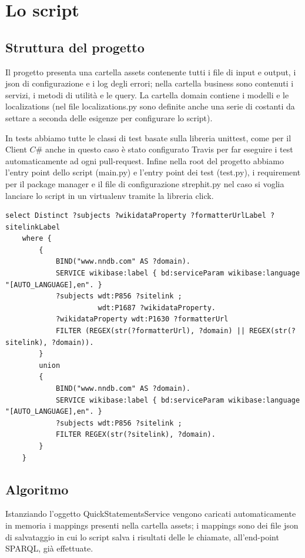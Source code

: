 \section{Lo script}

\subsection{Struttura del progetto}
Il progetto presenta una cartella assets contenente tutti i file di input e output, i json di configurazione e i log degli errori; nella cartella business sono contenuti i servizi,
i metodi di utilità e le query. La cartella domain contiene i modelli e le localizations (nel file localizations.py sono definite anche una serie di costanti da settare a seconda 
delle esigenze per configurare lo script). 

In tests abbiamo tutte le classi di test basate sulla libreria unittest, come per il Client $C\#$ anche in questo caso è stato configurato Travis per far eseguire i test 
automaticamente ad ogni pull-request. Infine nella root del progetto abbiamo l'entry point dello script (main.py) e l'entry point dei test (test.py), i requirement per il package manager 
e il file di configurazione strephit.py nel caso si voglia lanciare lo script in un virtualenv tramite la libreria click.

\begin{lstlisting}[style=SPARQLStyle]
    select Distinct ?subjects ?wikidataProperty ?formatterUrlLabel ?sitelinkLabel
    where {
        {
            BIND("www.nndb.com" AS ?domain).
            SERVICE wikibase:label { bd:serviceParam wikibase:language "[AUTO_LANGUAGE],en". }
            ?subjects wdt:P856 ?sitelink ;
                      wdt:P1687 ?wikidataProperty.
            ?wikidataProperty wdt:P1630 ?formatterUrl
            FILTER (REGEX(str(?formatterUrl), ?domain) || REGEX(str(?sitelink), ?domain)).
        }
        union
        {
            BIND("www.nndb.com" AS ?domain).
            SERVICE wikibase:label { bd:serviceParam wikibase:language "[AUTO_LANGUAGE],en". }
            ?subjects wdt:P856 ?sitelink ;
            FILTER REGEX(str(?sitelink), ?domain).
        }
    }
\end{lstlisting}

\subsection{Algoritmo}
Istanziando l'oggetto QuickStatementsService vengono caricati automaticamente in memoria i mappings presenti nella cartella assets; 
i mappings sono dei file json di salvataggio in cui lo script salva i risultati delle le chiamate, all'end-point SPARQL, già effettuate.


